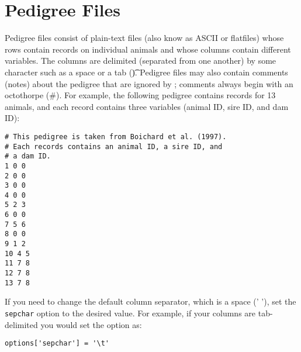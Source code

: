 \section{Pedigree Files}
\label{sec:pedigree-files}
Pedigree files consist of plain-text files (also know as ASCII or flatfiles) whose rows contain
records on individual animals and whose columns contain different variables.  The columns are
delimited (separated from one another) by some character such as a space or a tab (\t).  Pedigree
files may also contain comments (notes) about the pedigree that are ignored by \PyPedal{}; comments
always begin with an octothorpe (\#).  For example, the following pedigree contains records for 13
animals, and each record contains three variables (animal ID, sire ID, and dam ID):
\begin{verbatim}
# This pedigree is taken from Boichard et al. (1997).
# Each records contains an animal ID, a sire ID, and
# a dam ID.
1 0 0
2 0 0
3 0 0
4 0 0
5 2 3
6 0 0
7 5 6
8 0 0
9 1 2
10 4 5
11 7 8
12 7 8
13 7 8
\end{verbatim}
If you need to change the default column separator, which is a space (' '), set the
\texttt{sepchar} option to the desired value.  For example, if your columns are
tab-delimited you would set the option as:
\begin{verbatim}
options['sepchar'] = '\t'
\end{verbatim}
